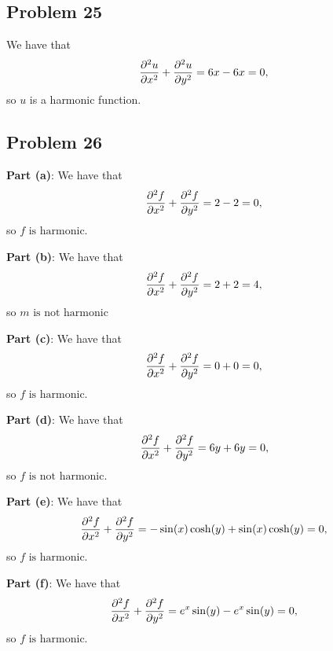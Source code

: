 \documentclass[11pt]{article}
\begin{document}

\subsection{Problem 25}

We have that
\[
	\pdv[2]{u}{x} + \pdv[2]{u}{y} = 6x -6x = 0,
\]
so $u$ is a harmonic function.


\subsection{Problem 26}

\textbf{Part (a)}: We have that
\[
	\pdv[2]{f}{x} + \pdv[2]{f}{y} = 2 - 2 = 0,
\]
so $\boxed{\text{$f$ is harmonic}}$.

\textbf{Part (b)}: We have that
\[
	\pdv[2]{f}{x} + \pdv[2]{f}{y} = 2 + 2 = 4,
\]
so $\boxed{\text{$m$ is not harmonic}}$

\textbf{Part (c)}: We have that
\[
	\pdv[2]{f}{x} + \pdv[2]{f}{y} = 0 + 0 = 0,
\]
so $\boxed{\text{$f$ is harmonic}}$.

\textbf{Part (d)}: We have that
\[
	\pdv[2]{f}{x} + \pdv[2]{f}{y} = 6y + 6y = 0,
\]
so $\boxed{\text{$f$ is not harmonic}}$.

\textbf{Part (e)}: We have that
\[
	\pdv[2]{f}{x} + \pdv[2]{f}{y} = -\sin(x)\cosh(y) + \sin(x)\cosh(y) = 0,
\]
so $\boxed{\text{$f$ is harmonic}}$.

\textbf{Part (f)}: We have that
\[
	\pdv[2]{f}{x} + \pdv[2]{f}{y} = e^{x} \sin(y) - e^{x}\sin(y) = 0,
\]
so $\boxed{\text{$f$ is harmonic}}$.

\end{document}
